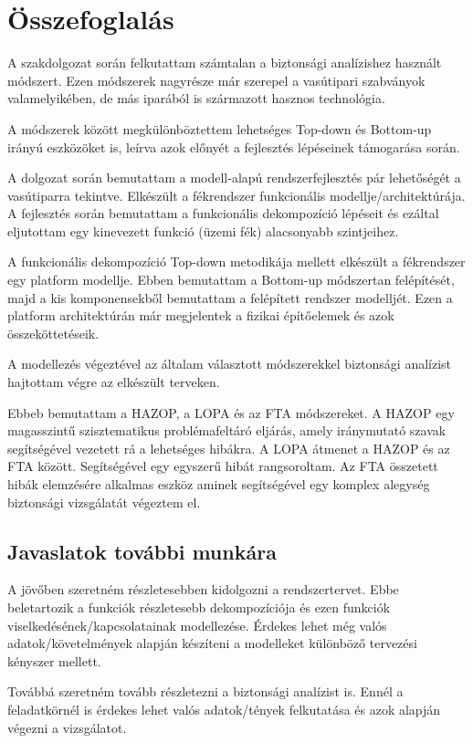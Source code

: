 \chapter{Összefoglalás}
A szakdolgozat során felkutattam számtalan a biztonsági analízishez használt módszert.
Ezen módszerek nagyrésze már szerepel a vasútipari szabványok valamelyikében, de más iparából is származott hasznos technológia.

A módszerek között megkülönböztettem lehetséges Top-down és Bottom-up irányú eszközöket is, leírva azok előnyét a fejlesztés lépéseinek támogarása során.

A dolgozat során bemutattam a modell-alapú rendszerfejlesztés pár lehetőségét a vasútiparra tekintve.
Elkészült a fékrendszer funkcionális modellje/architektúrája.
A fejlesztés során bemutattam a funkcionális dekompozíció lépéseit és ezáltal eljutottam egy kinevezett funkció (üzemi fék) alacsonyabb szintjeihez.

A funkcionális dekompozíció Top-down metodikája mellett elkészült a fékrendszer egy platform modellje.
Ebben bemutattam a Bottom-up módszertan felépítését, majd a kis komponensekből bemutattam a felépített rendszer modelljét.
Ezen a platform architektúrán már megjelentek a fizikai építőelemek és azok összeköttetéseik.

A modellezés végeztével az általam választott módszerekkel biztonsági analízist hajtottam végre az elkészült terveken.

Ebbeb bemutattam a HAZOP, a LOPA és az FTA módszereket.
A HAZOP egy magasszintű szisztematikus problémafeltáró eljárás, amely iránymutató szavak segítségével vezetett rá a lehetséges hibákra.
A LOPA átmenet a HAZOP és az FTA között. Segítségével egy egyszerű hibát rangsoroltam.
Az FTA összetett hibák elemzésére alkalmas eszköz aminek segítségével egy komplex alegység biztonsági vizsgálatát végeztem el.

\section{Javaslatok további munkára}
A jövőben szeretném részletesebben kidolgozni a rendszertervet.
Ebbe beletartozik a funkciók részletesebb dekompozíciója és ezen funkciók viselkedésének/kapcsolatainak modellezése.
Érdekes lehet még valós adatok/követelmények alapján készíteni a modelleket különböző tervezési kényszer mellett.

Továbbá szeretném tovább részletezni a biztonsági analízist is.
Ennél a feladatkörnél is érdekes lehet valós adatok/tények felkutatása és azok alapján végezni a vizsgálatot.